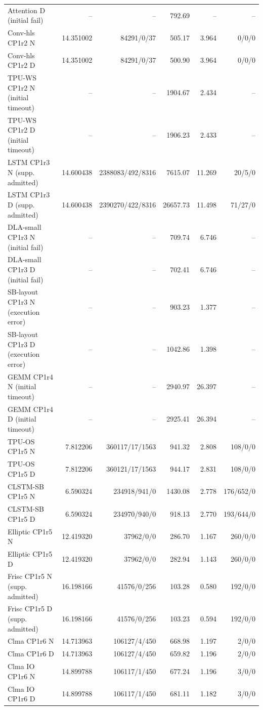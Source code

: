 \documentclass[conference,10pt]{IEEEtran}
\begin{document}
\begin{table}[t]
\begin{tabular}{lrrrrr}
Attention D (initial fail)&--&--&792.69&--&--\\
Conv-hls CP1r2 N&14.351002&84291/0/37&505.17&3.964&0/0/0\\
Conv-hls CP1r2 D&14.351002&84291/0/37&500.90&3.964&0/0/0\\
TPU-WS CP1r2 N (initial timeout)&--&--&1904.67&2.434&--\\
TPU-WS CP1r2 D (initial timeout)&--&--&1906.23&2.433&--\\
LSTM CP1r3 N (supp. admitted)&14.600438&2388083/492/8316&7615.07&11.269&20/5/0\\
LSTM CP1r3 D (supp. admitted)&14.600438&2390270/422/8316&26657.73&11.498&71/27/0\\
DLA-small CP1r3 N (initial fail)&--&--&709.74&6.746&--\\
DLA-small CP1r3 D (initial fail)&--&--&702.41&6.746&--\\
SB-layout CP1r3 N (execution error)&--&--&903.23&1.377&--\\
SB-layout CP1r3 D (execution error)&--&--&1042.86&1.398&--\\
GEMM CP1r4 N (initial timeout)&--&--&2940.97&26.397&--\\
GEMM CP1r4 D (initial timeout)&--&--&2925.41&26.394&--\\
TPU-OS CP1r5 N&7.812206&360117/17/1563&941.32&2.808&108/0/0\\
TPU-OS CP1r5 D&7.812206&360121/17/1563&944.17&2.831&108/0/0\\
CLSTM-SB CP1r5 N&6.590324&234918/941/0&1430.08&2.778&176/652/0\\
CLSTM-SB CP1r5 D&6.590324&234970/940/0&918.13&2.770&193/644/0\\
Elliptic CP1r5 N&12.419320&37962/0/0&286.70&1.167&260/0/0\\
Elliptic CP1r5 D&12.419320&37962/0/0&282.94&1.143&260/0/0\\
Frisc CP1r5 N (supp. admitted)&16.198166&41576/0/256&103.28&0.580&192/0/0\\
Frisc CP1r5 D (supp. admitted)&16.198166&41576/0/256&103.23&0.594&192/0/0\\
Clma CP1r6 N&14.713963&106127/4/450&668.98&1.197&2/0/0\\
Clma CP1r6 D&14.713963&106127/4/450&659.82&1.196&2/0/0\\
Clma IO CP1r6 N&14.899788&106117/1/450&677.24&1.196&3/0/0\\
Clma IO CP1r6 D&14.899788&106117/1/450&681.11&1.182&3/0/0\\
\hline\end{tabular}
\end{table}
\end{document}
